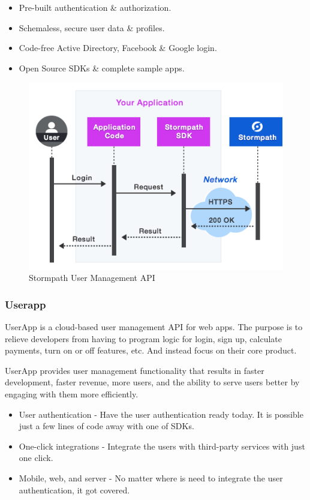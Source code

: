 \begin{itemize}
\item Pre-built authentication \& authorization.
\item Schemaless, secure user data \& profiles.
\item Code-free Active Directory, Facebook \& Google login.
\item Open Source SDKs \& complete sample apps.
\end{itemize}

\begin {figure}[h]
\graphicspath{{images/chapter_USR/}}
\includegraphics[width=\textwidth]{stormpath}
\caption{Stormpath User Management API}
\end {figure}

\subsubsection{Userapp}

UserApp is a cloud-based user management API for web apps. The purpose is to relieve developers from having to program logic for login, sign up, calculate payments, turn on or off features, etc. And instead focus on their core product.

UserApp provides user management functionality that results in faster development, faster revenue, more users, and the ability to serve users better by engaging with them more efficiently.\cite{usr_userapp}

\begin{itemize}
\item User authentication - Have the user authentication ready today. It is possible just a few lines of code away with one of SDKs.
\item One-click integrations - Integrate the users with third-party services with just one click.
\item Mobile, web, and server - No matter where is need to integrate the user authentication, it got  covered.
\end{itemize}


